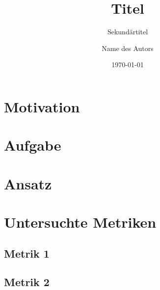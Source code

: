 \documentclass[fontsize=11pt,%
               paper=a4,%
               headings=small,
               DIV=15]{scrartcl}
\title{Titel}
\subtitle{Sekundärtitel}
\author{Name des Autors}
\date{\today}
\begin{document}
\maketitle

\listoftodos

\section*{Motivation}
\blindtext
\cite{rfc1337}

\section*{Aufgabe}
\blindtext

\section*{Ansatz}
\blindtext

\section*{Untersuchte Metriken}
\blindtext

\subsection*{Metrik 1}
\blindtext

\subsection*{Metrik 2}
\blindtext





\end{document}
